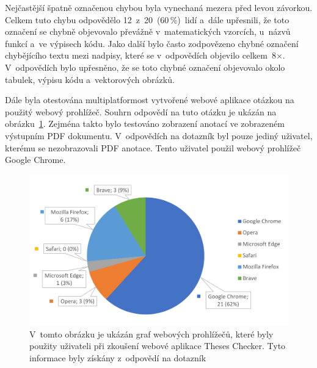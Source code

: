 Nejčastější špatně označenou chybou byla vynechaná mezera před levou závorkou. 
Celkem tuto chybu odpovědělo 12~z~20~(60\,\%)~lidí a~dále upřesnili, že
toto označení se chybně objevovalo převážně v~matematických vzorcích, u~názvů
funkcí a~ve výpisech kódu. Jako další bylo často zodpovězeno chybné označení
chybějícího textu mezi nadpisy, které se v~odpovědích objevilo celkem~8$\times$.
V~odpovědích bylo upřesněno, že se toto chybné označení objevovalo
okolo tabulek, výpisu kódu a~vektorových obrázků.

Dále byla otestována multiplatformost vytvořené webové aplikace otázkou
na použitý webový prohlížeč. Souhrn odpovědí na tuto otázku je ukázán na
obrázku~\ref{pic_graph_browser}. Zejména takto bylo testováno zobrazení
anotací ve zobrazeném výstupním PDF dokumentu. V~odpovědích na dotazník
byl pouze jediný uživatel, kterému se nezobrazovali PDF anotace. Tento 
uživatel použil webový prohlížeč Google Chrome.

\begin{figure}[H]
    \centering
    \includegraphics[width=0.85\linewidth]{obrazky-figures/graph_browser.pdf}
    \caption{
        V~tomto obrázku je ukázán graf webových prohlížečů, které byly
        použity uživateli při zkoušení webové aplikace Theses Checker.
        Tyto informace byly získány z~odpovědí na dotazník
    }
    \label{pic_graph_browser}
\end{figure}

